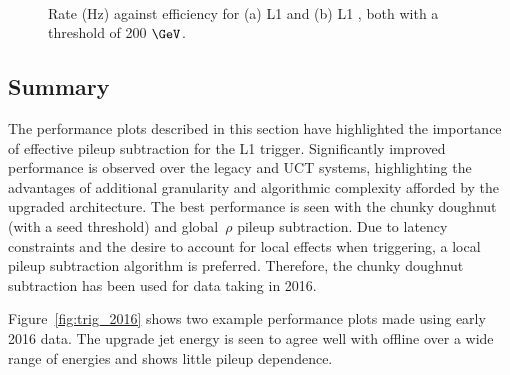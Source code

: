 \begin{figure}
\centering
	~
	\caption{Rate (Hz) against efficiency for (a) L1 \scalht and (b) L1 \mht, both with a
	threshold of 200 $\GeV$.}
	    \label{fig:rate_eff_sum}
\end{figure}

\subsection{Summary}

The performance plots described in this section have highlighted the importance of effective
pileup subtraction for the L1 trigger. Significantly improved performance is observed over 
the legacy and UCT systems, highlighting the advantages of additional granularity
and algorithmic complexity afforded by the upgraded architecture.
The best performance is seen with the chunky doughnut (with a seed threshold) 
and global~$\rho$ pileup subtraction. Due to latency constraints and the desire to account for 
local effects when triggering, a local pileup subtraction algorithm is preferred. 
Therefore, the chunky doughnut subtraction has been used for data taking in 2016.

Figure~\ref{fig:trig_2016} shows two example performance plots made using early 2016 data. 
The upgrade jet energy is seen to agree well with offline over a wide range of energies 
and shows little pileup dependence.



